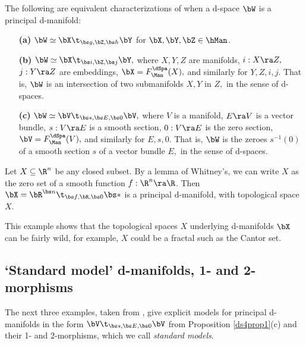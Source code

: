 \documentclass{article}
\begin{document}
\begin{prop} The following are equivalent characterizations of when
a d-space $\bW$ is a principal d-manifold:
\begin{itemize}
\setlength{\itemsep}{0pt}
\setlength{\parsep}{0pt}
\item[{\bf(a)}] $\bW\simeq \bX\t_{\bs g,\bZ,\bs
h}\bY$ for $\bX,\bY,\bZ\in\hMan$.
\item[{\bf(b)}] $\bW\simeq \bX\t_{\bs i,\bZ,\bs
j}\bY,$ where $X,Y,Z$ are manifolds, $i:X\ra Z,$ $j:Y\ra Z$ are
embeddings, $\bX=F_\Man^\dSpa(X),$ and similarly for $Y,Z,i,j$.
That is, $\bW$ is an intersection of two submanifolds $X,Y$ in
$Z,$ in the sense of d-spaces.
\item[{\bf(c)}] $\bW\simeq \bV\t_{\bs s,\bs E,\bs 0}\bV,$ where $V$
is a manifold, $E\ra V$ is a vector bundle, $s:V\ra E$ is a
smooth section, $0:V\ra E$ is the zero section,
$\bV=F_\Man^\dSpa(V),$ and similarly for $E,s,0$. That is, $\bW$
is the zeroes $s^{-1}(0)$ of a smooth section $s$ of a vector
bundle $E,$ in the sense of d-spaces.
\end{itemize}
\label{ds4prop1}
\end{prop}

\begin{ex} Let $X\subseteq\R^n$ be any closed subset. By a lemma of
Whitney's, we can write $X$ as the zero set of a smooth function
$f:\R^n\ra\R$. Then $\bX=\bR^{\bs n}\t_{\bs f,\bR,\bs 0}\bs *$ is a
principal d-manifold, with topological space~$X$.
\label{ds4ex1}
\end{ex}

This example shows that the topological spaces $X$ underlying
d-manifolds $\bX$ can be fairly wild, for example, $X$ could be a
fractal such as the Cantor set.

\subsection{`Standard model' d-manifolds, 1- and 2-morphisms}
\label{ds42}

The next three examples, taken from \cite[\S 3.2 \& \S 3.4]{Joyc6},
give explicit models for principal d-manifolds in the form
$\bV\t_{\bs s,\bs E,\bs 0}\bV$ from Proposition \ref{ds4prop1}(c)
and their 1- and 2-morphisms, which we call {\it standard models}.
\end{document}
